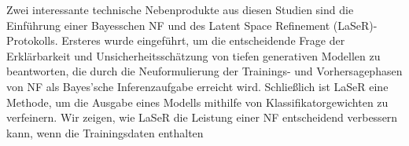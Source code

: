 Zwei interessante technische Nebenprodukte aus diesen Studien sind die Einführung einer Bayesschen NF und des Latent Space Refinement (LaSeR)-Protokolls. Ersteres wurde eingeführt, um die entscheidende Frage der Erklärbarkeit und Unsicherheitsschätzung von tiefen generativen Modellen zu beantworten, die durch die Neuformulierung der Trainings- und Vorhersagephasen von NF als Bayes'sche Inferenzaufgabe erreicht wird. Schließlich ist LaSeR eine Methode, um die Ausgabe eines Modells mithilfe von Klassifikatorgewichten zu verfeinern. Wir zeigen, wie LaSeR die Leistung einer NF entscheidend verbessern kann, wenn die Trainingsdaten enthalten

%
